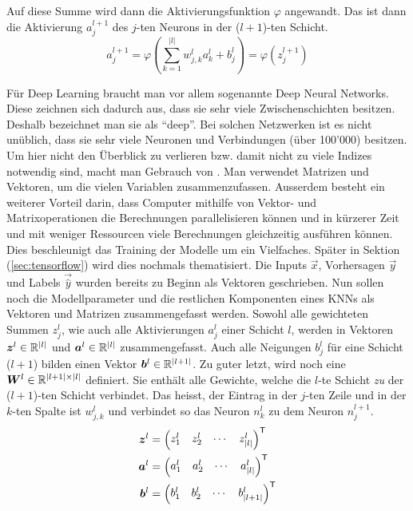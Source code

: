 Auf diese Summe wird dann die Aktivierungsfunktion $\varphi$ angewandt.
Das ist dann die Aktivierung $a_j^{l+1}$ des $j$-ten Neurons in der ($l+1$)-ten Schicht.
\\
\begin{equation}\tag{FP2}\label{eq:aktivierung_normal}
  a_j^{l+1} = \varphi\left(\sum_{k=1}^{|l|} w_{j,k}^l a_k^{l} + b_j^l \right) = \varphi \left( z_j^{l+1} \right)
\end{equation}
\par\bigskip
Für Deep Learning braucht man vor allem sogenannte Deep Neural Networks. Diese
zeichnen sich dadurch aus, dass sie sehr viele Zwischenschichten besitzen.
Deshalb bezeichnet man sie als ``deep''.
Bei solchen Netzwerken ist es nicht unüblich,
dass sie sehr viele Neuronen und Verbindungen (über 100'000) besitzen.
Um hier nicht den Überblick zu verlieren bzw. damit nicht zu viele Indizes notwendig
sind, macht man Gebrauch von . Man verwendet
Matrizen und Vektoren, um die vielen Variablen zusammenzufassen.
Ausserdem besteht ein weiterer Vorteil darin, dass Computer mithilfe von Vektor-
und Matrixoperationen die Berechnungen parallelisieren können und in kürzerer
Zeit und mit weniger Ressourcen viele Berechnungen gleichzeitig ausführen können.
Dies beschleunigt das Training der Modelle um
ein Vielfaches. Später in Sektion (\ref{sec:tensorflow}) wird dies nochmals thematisiert.
\para{}
Die Inputs $\vec{x}$, Vorhersagen $\vec{y}$ und Labels $\vec{\hat{y}}$ wurden
bereits zu Beginn als Vektoren geschrieben.
Nun sollen noch die Modellparameter und die restlichen Komponenten eines KNNs als Vektoren und Matrizen zusammengefasst werden.
Sowohl alle gewichteten Summen $z_j^l$, wie auch alle Aktivierungen $a_j^l$
einer Schicht $l$, werden in Vektoren $\bm{z}^l \in \mathbb{R}^{|l|}$ und
$\bm{a}^l \in \mathbb{R}^{|l|}$ zusammengefasst.
Auch alle Neigungen $b_j^l$ für eine Schicht ($l+1$) bilden einen Vektor
$\bm{b}^l \in \mathbb{R}^{|l+1|}$.
\para{}
Zu guter letzt, wird noch eine  $\bm{W}^l \in
\mathbb{R}^{|l+1| \times |l|}$
definiert. Sie enthält alle Gewichte, welche die $l$-te
Schicht \textit{zu} der ($l+1$)-ten Schicht verbindet.
Das heisst, der Eintrag in der $j$-ten Zeile und in
der $k$-ten Spalte ist $w_{j,k}^l$ und verbindet so das Neuron $n_k^{l}$ zu
dem Neuron $n_j^{l+1}$.
\\
\begin{align*}
  \bm{z}^l &=  \begin{pmatrix} z_1^l & z_2^l & \cdots & z_{|l|}^l \end{pmatrix}^{\mathsf{T}} \\
  \bm{a}^l &=  \begin{pmatrix} a_1^l & a_2^l & \cdots & a_{|l|}^l \end{pmatrix}^{\mathsf{T}} \\
  \bm{b}^l &=  \begin{pmatrix} b_1^l & b_2^l & \cdots & b_{|l+1|}^l \end{pmatrix}^{\mathsf{T}} \\
\end{align*}
